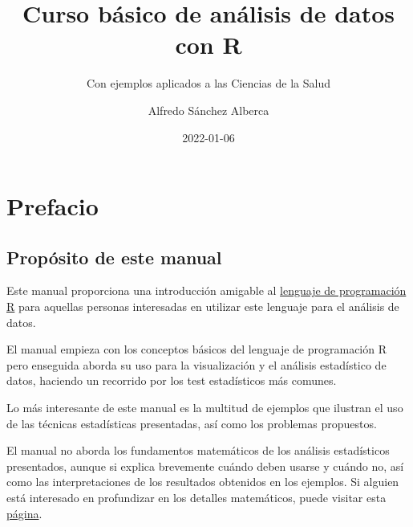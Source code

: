 \documentclass[
  a4paper,
]{scrreport}
\title{Curso básico de análisis de datos con R}
\subtitle{Con ejemplos aplicados a las Ciencias de la Salud}
\author{Alfredo Sánchez Alberca}
\date{2022-01-06}
\renewcommand*\contentsname{Indice de contenidos}
\newcommand\contentsname{Indice de contenidos}
\theoremstyle{definition}
\theoremstyle{definition}
\theoremstyle{remark}
\begin{document}
\maketitle
\ifdefined\Shaded\renewenvironment{Shaded}{\begin{tcolorbox}[interior hidden, enhanced, borderline west={3pt}{0pt}{shadecolor}, boxrule=0pt, breakable, sharp corners, frame hidden]}{\end{tcolorbox}}\fi

\renewcommand*\contentsname{Indice de contenidos}
{
\hypersetup{linkcolor=}
\setcounter{tocdepth}{2}
\tableofcontents
}

\hypertarget{prefacio}{%
\chapter*{Prefacio}\label{prefacio}}


\hypertarget{propuxf3sito-de-este-manual}{%
\section*{Propósito de este manual}\label{propuxf3sito-de-este-manual}}


Este manual proporciona una introducción amigable al
\href{https://www.r-project.org/}{lenguaje de programación R} para
aquellas personas interesadas en utilizar este lenguaje para el análisis
de datos.

El manual empieza con los conceptos básicos del lenguaje de programación
R pero enseguida aborda su uso para la visualización y el análisis
estadístico de datos, haciendo un recorrido por los test estadísticos
más comunes.

Lo más interesante de este manual es la multitud de ejemplos que
ilustran el uso de las técnicas estadísticas presentadas, así como los
problemas propuestos.

El manual no aborda los fundamentos matemáticos de los análisis
estadísticos presentados, aunque si explica brevemente cuándo deben
usarse y cuándo no, así como las interpretaciones de los resultados
obtenidos en los ejemplos. Si alguien está interesado en profundizar en
los detalles matemáticos, puede visitar esta
\href{https://aprendeconalf.es/docencia/estadistica/}{página}.
\end{document}
